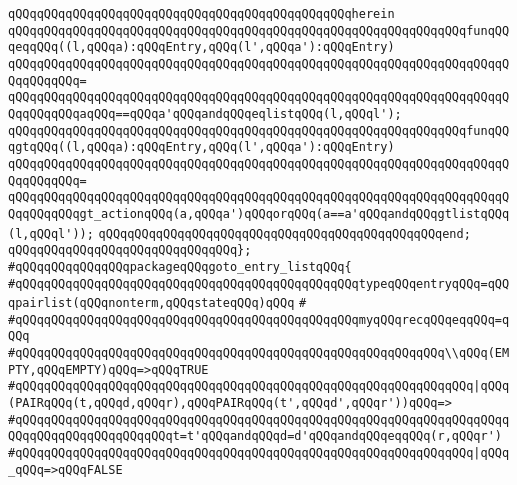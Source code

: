 \verb|qQQqqQQqqQQqqQQqqQQqqQQqqQQqqQQqqQQqqQQqqQQqqQQqherein|\newline
\verb|qQQqqQQqqQQqqQQqqQQqqQQqqQQqqQQqqQQqqQQqqQQqqQQqqQQqqQQqqQQqqQQqfunqQQqeqqQQq((l,qQQqa):qQQqEntry,qQQq(l',qQQqa'):qQQqEntry)|\newline
\verb|qQQqqQQqqQQqqQQqqQQqqQQqqQQqqQQqqQQqqQQqqQQqqQQqqQQqqQQqqQQqqQQqqQQqqQQqqQQqqQQq=|\newline
\verb|qQQqqQQqqQQqqQQqqQQqqQQqqQQqqQQqqQQqqQQqqQQqqQQqqQQqqQQqqQQqqQQqqQQqqQQqqQQqqQQqaqQQq==qQQqa'qQQqandqQQqeqlistqQQq(l,qQQql');|\newline
\newline
\verb|qQQqqQQqqQQqqQQqqQQqqQQqqQQqqQQqqQQqqQQqqQQqqQQqqQQqqQQqqQQqqQQqfunqQQqgtqQQq((l,qQQqa):qQQqEntry,qQQq(l',qQQqa'):qQQqEntry)|\newline
\verb|qQQqqQQqqQQqqQQqqQQqqQQqqQQqqQQqqQQqqQQqqQQqqQQqqQQqqQQqqQQqqQQqqQQqqQQqqQQqqQQq=|\newline
\verb|qQQqqQQqqQQqqQQqqQQqqQQqqQQqqQQqqQQqqQQqqQQqqQQqqQQqqQQqqQQqqQQqqQQqqQQqqQQqqQQqgt_actionqQQq(a,qQQqa')qQQqorqQQq(a==a'qQQqandqQQqgtlistqQQq(l,qQQql'));|\newline
\verb|qQQqqQQqqQQqqQQqqQQqqQQqqQQqqQQqqQQqqQQqqQQqqQQqend;|\newline
\verb|qQQqqQQqqQQqqQQqqQQqqQQqqQQqqQQq};|\newline
\newline
\verb|#qQQqqQQqqQQqqQQqpackageqQQqgoto_entry_listqQQq{|\newline
\verb|#qQQqqQQqqQQqqQQqqQQqqQQqqQQqqQQqqQQqqQQqqQQqqQQqtypeqQQqentryqQQq=qQQqpairlist(qQQqnonterm,qQQqstateqQQq)qQQq|\newline
\verb|#|\newline
\verb|#qQQqqQQqqQQqqQQqqQQqqQQqqQQqqQQqqQQqqQQqqQQqqQQqmyqQQqrecqQQqeqqQQq=qQQq|\newline
\verb|#qQQqqQQqqQQqqQQqqQQqqQQqqQQqqQQqqQQqqQQqqQQqqQQqqQQqqQQqqQQq\\qQQq(EMPTY,qQQqEMPTY)qQQq=>qQQqTRUE|\newline
\verb|#qQQqqQQqqQQqqQQqqQQqqQQqqQQqqQQqqQQqqQQqqQQqqQQqqQQqqQQqqQQqqQQq|\verb#|qQQq(PAIRqQQq(t,qQQqd,qQQqr),qQQqPAIRqQQq(t',qQQqd',qQQqr'))qQQq=>#\newline
\verb|#qQQqqQQqqQQqqQQqqQQqqQQqqQQqqQQqqQQqqQQqqQQqqQQqqQQqqQQqqQQqqQQqqQQqqQQqqQQqqQQqqQQqqQQqqQQqt=t'qQQqandqQQqd=d'qQQqandqQQqeqqQQq(r,qQQqr')|\newline
\verb|#qQQqqQQqqQQqqQQqqQQqqQQqqQQqqQQqqQQqqQQqqQQqqQQqqQQqqQQqqQQqqQQq|\verb#|qQQq_qQQq=>qQQqFALSE#\newline
